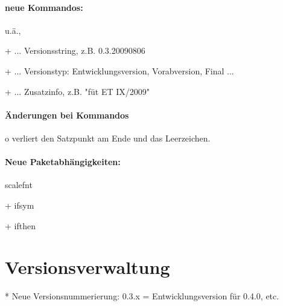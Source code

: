 \documentclass[ngerman,a4paper,fontsize=9pt,BCOR=0cm,DIV=11,headings=big,draft=no]{scrreprt}
\begin{document}
\subsubsection{neue Kommandos:} 


 u.ä.,


               +  ...
Versionsstring, z.B. 0.3.20090806

                + 
                ... Versionstyp: Entwicklungsversion, Vorabversion, Final ...

                + 
                ... Zusatzinfo, z.B. "füt ET IX/2009"

\subsubsection{Änderungen bei Kommandos}

          o \gTxMassVit verliert den
          Satzpunkt am Ende und das Leerzeichen.

\subsubsection{Neue Paketabhängigkeiten:}

scalefnt

                + ifsym

                + ifthen




\chapter{Versionsverwaltung}

    * Neue Versionsnummerierung:
    0.3.x = Entwicklungsversion für 0.4.0, etc.
\end{document}
